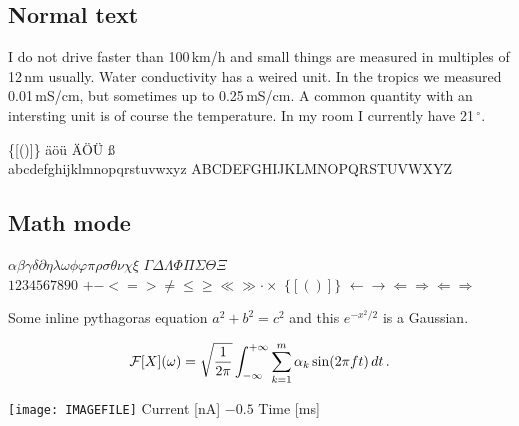 \subsection{Normal text}

I do not drive faster than 100\,km/h and small things are measured in
multiples of 12\,nm usually. Water conductivity has a weired unit. In
the tropics we measured 0.01\,mS/cm, but sometimes up to
0.25\,mS/cm. A common quantity with an intersting unit is of course
the temperature. In my room I currently have 21\,$^{\circ}$.

\bigskip
{} \qquad \{[()]\} \qquad \"a\"o\"u  \"A\"O\"U {\ss} \\
abcdefghijklmnopqrstuvwxyz \qquad ABCDEFGHIJKLMNOPQRSTUVWXYZ

\subsection{Math mode}

$\alpha\beta\gamma\delta\partial\eta\lambda\omega\phi\varphi\pi\rho\sigma\theta\nu\chi\xi$ \qquad $\Gamma\Delta\Lambda\Phi\Pi\Sigma\Theta\Xi$\\
$1234567890$
\qquad $+ - <=> \ne \le \ge \ll \gg \cdot \times$
\qquad $\{[()]\}$
\qquad $\leftarrow \rightarrow \Leftarrow \Rightarrow \Longleftarrow \Longrightarrow$

\bigskip
\noindent
Some inline pythagoras equation $a^2 + b^2 = c^2$ and this $e^{-x^2/2}$ is a Gaussian.

\[ {\cal F}[X](\omega) = \sqrt{\frac{1}{2\pi}}\int_{-\infty}^{+\infty} \sum_{k=1}^m \alpha_k\sin(2\pi f t)\,dt\,. \]

\noindent
\texttt{[image: IMAGEFILE]}
Current [nA] \qquad $-0.5$   \qquad Time [ms]
